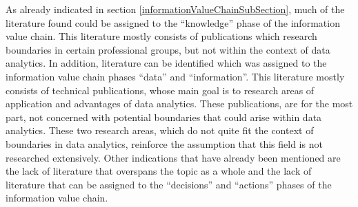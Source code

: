 As already indicated in section \ref{informationValueChainSubSection}, much of the literature found could be assigned to the \enquote{knowledge} phase of the information value chain. This literature mostly consists of publications which research boundaries in certain professional groups, but not within the context of data analytics. In addition, literature can be identified which was assigned to the information value chain phases \enquote{data} and \enquote{information}. This literature mostly consists of technical publications, whose main goal is to research areas of application and advantages of data analytics. These publications, are for the most part, not concerned with potential boundaries that could arise within data analytics. These two research areas, which do not quite fit the context of boundaries in data analytics, reinforce the assumption that this field is not researched extensively. Other indications that have already been mentioned are the lack of literature that overspans the topic as a whole and the lack of literature that can be assigned to the \enquote{decisions} and \enquote{actions} phases of the information value chain. %




